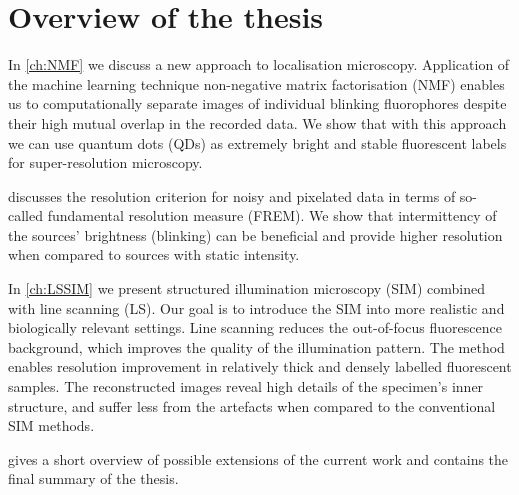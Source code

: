 \clearpage
\section{Overview of the thesis}

In \autoref{ch:NMF} we discuss a new approach to localisation microscopy. Application of the machine learning technique non-negative matrix factorisation (NMF) enables us to computationally separate images of individual blinking fluorophores despite their high mutual overlap in the recorded data. We show that with this approach we can use quantum dots (QDs) as extremely bright and stable fluorescent labels for super-resolution microscopy. 

 discusses the resolution criterion for noisy and pixelated data in terms of so-called fundamental resolution measure (FREM). We show that intermittency of the sources' brightness (blinking) can be beneficial and provide higher resolution when compared to sources with static intensity. 

In \autoref{ch:LSSIM} we present structured illumination microscopy (SIM) combined with line scanning (LS). Our goal is to introduce the SIM into more realistic and biologically relevant settings. Line scanning reduces the out-of-focus fluorescence background, which improves the quality of the illumination pattern. The method enables resolution improvement in relatively thick and densely labelled fluorescent samples. The reconstructed images reveal high details of the specimen's inner structure, and suffer less from the artefacts when compared to the conventional SIM methods.  

 gives a short overview of possible extensions of the current work and contains the final summary of the thesis. 

